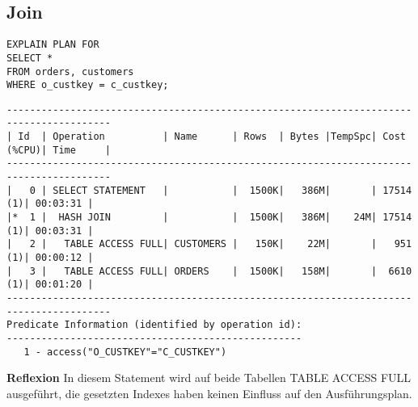 \documentclass[10pt]{article}
\begin{document}
\subsection{Join}
\begin{lstlisting}[style=sql]
EXPLAIN PLAN FOR
SELECT *
FROM orders, customers
WHERE o_custkey = c_custkey;
\end{lstlisting}
\begin{lstlisting}[style=queryexecutionplan]
----------------------------------------------------------------------------------------
| Id  | Operation          | Name      | Rows  | Bytes |TempSpc| Cost (%CPU)| Time     |
----------------------------------------------------------------------------------------
|   0 | SELECT STATEMENT   |           |  1500K|   386M|       | 17514   (1)| 00:03:31 |
|*  1 |  HASH JOIN         |           |  1500K|   386M|    24M| 17514   (1)| 00:03:31 |
|   2 |   TABLE ACCESS FULL| CUSTOMERS |   150K|    22M|       |   951   (1)| 00:00:12 |
|   3 |   TABLE ACCESS FULL| ORDERS    |  1500K|   158M|       |  6610   (1)| 00:01:20 |
----------------------------------------------------------------------------------------
Predicate Information (identified by operation id):
---------------------------------------------------
   1 - access("O_CUSTKEY"="C_CUSTKEY")
\end{lstlisting}
\textbf{Reflexion} \newline
In diesem Statement wird auf beide Tabellen TABLE ACCESS FULL ausgeführt, die gesetzten Indexes haben keinen Einfluss auf den Ausführungsplan.
\end{document}
